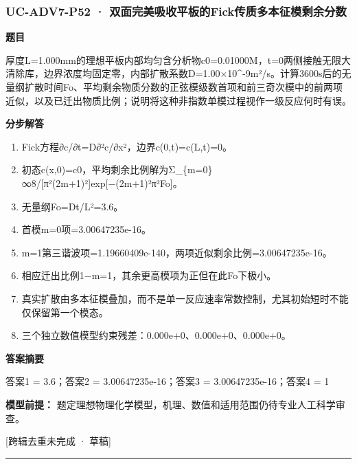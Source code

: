 \documentclass[UTF8,11pt,a4paper]{ctexart}
\begin{document}
\subsubsection*{UC-ADV7-P52 · 双面完美吸收平板的Fick传质多本征模剩余分数}
\noindent\textbf{题目}\par
厚度L=1.000mm的理想平板内部均匀含分析物c0=0.01000M，t=0两侧接触无限大清除库，边界浓度均固定零，内部扩散系数D=1.00×10\textasciicircum{}-9m²/s。计算3600s后的无量纲扩散时间Fo、平均剩余物质分数的正弦模级数首项和前三奇次模中的前两项近似，以及已迁出物质比例；说明将这种非指数单模过程视作一级反应何时有误。\par
\medskip\noindent\textbf{分步解答}
\begin{enumerate}
\item Fick方程∂c/∂t=D∂²c/∂x²，边界c(0,t)=c(L,t)=0。
\item 初态c(x,0)=c0，平均剩余比例解为Σ\_\{m=0\}∞8/[π²(2m+1)²]exp[−(2m+1)²π²Fo]。
\item 无量纲Fo=Dt/L²=3.6。
\item 首模m=0项=3.00647235e-16。
\item m=1第三谐波项=1.19660409e-140，两项近似剩余比例=3.00647235e-16。
\item 相应迁出比例1−m=1，其余更高模项为正但在此Fo下极小。
\item 真实扩散由多本征模叠加，而不是单一反应速率常数控制，尤其初始短时不能仅保留第一个模态。
\item 三个独立数值模型约束残差：0.000e+0、0.000e+0、0.000e+0。
\end{enumerate}
\noindent\textbf{答案摘要}\par
答案1 = 3.6；答案2 = 3.00647235e-16；答案3 = 3.00647235e-16；答案4 = 1\par
\noindent\textbf{模型前提：}
题定理想物理化学模型，机理、数值和适用范围仍待专业人工科学审查。\par
\noindent\textcolor{red!65!black}{[跨辑去重未完成 · 草稿]} \par
\medskip\hrule\medskip
{}
\end{document}
